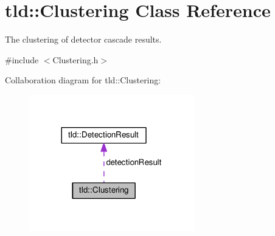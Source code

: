 \hypertarget{classtld_1_1Clustering}{\section{tld\-:\-:Clustering Class Reference}
\label{classtld_1_1Clustering}
}


The clustering of detector cascade results.  




{\ttfamily \#include $<$Clustering.\-h$>$}



Collaboration diagram for tld\-:\-:Clustering\-:\nopagebreak
\begin{figure}[H]
\begin{center}
\leavevmode
\includegraphics[width=204pt]{classtld_1_1Clustering__coll__graph}
\end{center}
\end{figure}
